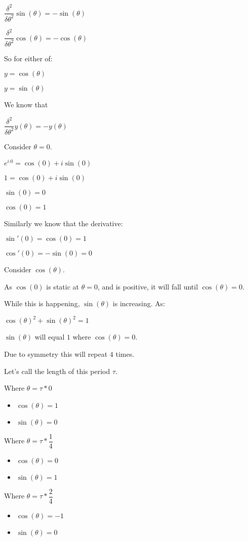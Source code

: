 \(\dfrac{\delta^2 }{\delta \theta^2}\sin (\theta )=-\sin (\theta )\)

\(\dfrac{\delta^2 }{\delta \theta^2}\cos (\theta )=-\cos (\theta )\)

So for either of:

\(y=\cos (\theta )\)

\(y=\sin (\theta )\)

We know that

\(\dfrac{\delta^2 }{\delta \theta^2}y(\theta )=-y(\theta )\)

Consider \(\theta =0\).

\(e^{i.0}=\cos (0)+i\sin (0)\)

\(1=\cos (0)+i\sin (0)\)

\(\sin (0)=0\)

\(\cos (0)=1\)

Similarly we know that the derivative:

\(\sin'(0)=\cos(0)=1\)

\(\cos'(0)=-\sin(0)=0\)

Consider \(\cos(\theta )\). 

As \(\cos (0)\) is static at \(\theta =0\), and is positive, it will fall until \(\cos (\theta )=0\).

While this is happening, \(\sin (\theta )\) is increasing. As:

\(\cos (\theta )^2+\sin (\theta )^2=1\)

\(\sin (\theta )\) will equal \(1\) where \(\cos (\theta )=0\).

Due to symmetry this will repeat \(4\) times.

Let's call the length of this period \(\tau \).

Where \(\theta =\tau *0\)

\begin{itemize}
\item \(\cos (\theta )=1\)
\item \(\sin (\theta )=0\)
\end{itemize}

Where \(\theta =\tau *\dfrac{1}{4}\)

\begin{itemize}
\item \(\cos (\theta )=0\)
\item \(\sin (\theta )=1\)
\end{itemize}

Where \(\theta =\tau *\dfrac{2}{4}\)

\begin{itemize}
\item \(\cos (\theta )=-1\)
\item \(\sin (\theta )=0\)
\end{itemize}

